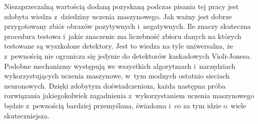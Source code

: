 Niezaprzeczalną wartością dodaną pozyskaną podczas pisania tej pracy
jest zdobyta wiedza z~dziedziny uczenia maszynowego. Jak ważny jest
dobrze przygotowany zbiór obrazów pozytywnych i~negatywnych. Ile znaczy
skuteczna procedura testowa i~jakie znaczenie ma liczebność zbioru danych
na których testowane są wyszkolone detektory. Jest to wiedza na tyle 
uniwersalna, że z~pewnością nie ogranicza się jedynie do detektorów
kaskadowych Violi-Jonesa. Podobne mechanizmy występują we wszystkich
algorytmach i~narzędziach wykorzystujących uczenia maszynowe, w~tym modnych
ostatnio sieciach neuronowych. Dzięki zdobytym doświadczeniom, każda
następna próba rozwiązania jakiegokolwiek zagadnienia z~wykorzystaniem uczenia maszynowego
będzie z~pewnością bardziej przemyślana, świadoma i~co za tym idzie o~wiele skuteczniejsza.

